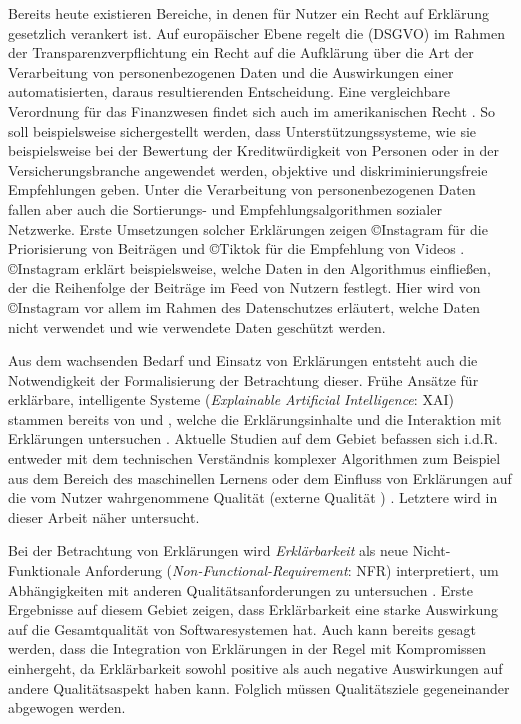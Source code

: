 Bereits heute existieren Bereiche, in denen für Nutzer ein \glqq Recht auf Erklärung\grqq{} gesetzlich verankert ist. Auf europäischer Ebene regelt die  (DSGVO) \cite{eu_verordnung_2016} im Rahmen der Transparenzverpflichtung ein Recht auf die Aufklärung über die Art der Verarbeitung von personenbezogenen Daten und die Auswirkungen einer automatisierten, daraus resultierenden Entscheidung. Eine vergleichbare Verordnung für das Finanzwesen findet sich auch im amerikanischen Recht \cite{cfpb_regulation_2018}. So soll beispielsweise sichergestellt werden, dass Unterstützungssysteme, wie sie beispielsweise bei der Bewertung der Kreditwürdigkeit von Personen oder in der Versicherungsbranche angewendet werden, objektive und diskriminierungsfreie Empfehlungen geben. Unter die Verarbeitung von personenbezogenen Daten fallen aber auch die Sortierungs- und Empfehlungsalgorithmen sozialer Netzwerke. Erste Umsetzungen solcher Erklärungen zeigen \copyright Instagram für die Priorisierung von Beiträgen und \copyright Tiktok für die Empfehlung von Videos \cite{mosseri_shedding_2021,tiktok_technology_limited_how_2021}. \copyright Instagram erklärt beispielsweise, welche Daten in den Algorithmus einfließen, der die Reihenfolge der Beiträge im Feed von Nutzern festlegt. Hier wird von \copyright Instagram vor allem im Rahmen des Datenschutzes erläutert, welche Daten nicht verwendet und wie verwendete Daten geschützt werden.

Aus dem wachsenden Bedarf und Einsatz von Erklärungen entsteht auch die Notwendigkeit der Formalisierung der Betrachtung dieser. Frühe Ansätze für erklärbare, intelligente Systeme (\textit{Explainable Artificial Intelligence}: XAI) stammen bereits von \citeauthor{byrne1991construction} und \citeauthor{cawsey1991generating}, welche die Erklärungsinhalte \cite{byrne1991construction} und die Interaktion mit Erklärungen untersuchen \cite{cawsey1991generating}. Aktuelle Studien auf dem Gebiet befassen sich i.d.R. entweder mit dem technischen Verständnis komplexer Algorithmen zum Beispiel aus dem Bereich des maschinellen Lernens \cite{gilpin_explaining_2018, fong_interpretable_2017, samek_towards_2019} oder dem Einfluss von Erklärungen auf die vom Nutzer wahrgenommene Qualität (externe Qualität \cite{international2011iso}) \cite{nunes_systematic_2017,kouki_user_2017,chazette_end-users_nodate}. Letztere wird in dieser Arbeit näher untersucht.

Bei der Betrachtung von Erklärungen wird \textit{Erklärbarkeit} als neue Nicht-Funktionale Anforderung (\textit{Non-Functional-Requirement}: NFR) interpretiert, um Abhängigkeiten mit anderen Qualitätsanforderungen zu untersuchen \cite{kohl_explainability_2019, chazette2020explainability}. Erste Ergebnisse auf diesem Gebiet zeigen, dass Erklärbarkeit eine starke Auswirkung auf die Gesamtqualität von Softwaresystemen hat. Auch kann bereits gesagt werden, dass die Integration von Erklärungen in der Regel mit Kompromissen einhergeht, da Erklärbarkeit sowohl positive als auch negative Auswirkungen auf andere Qualitätsaspekt haben kann. Folglich müssen Qualitätsziele gegeneinander abgewogen werden.

